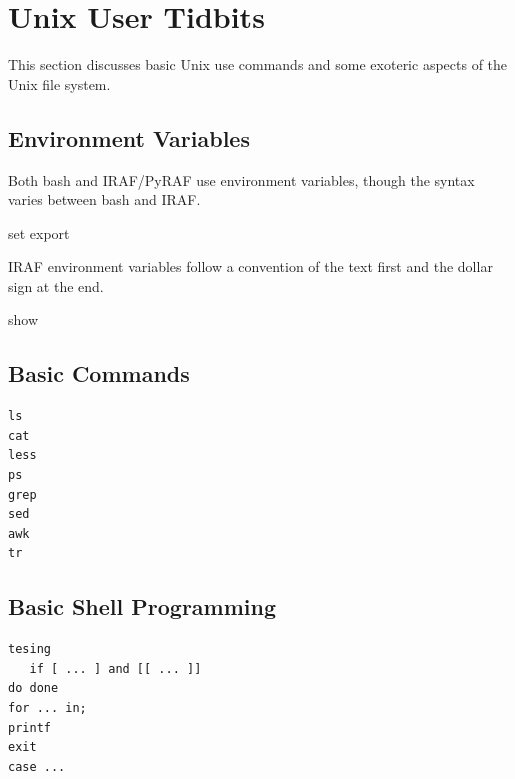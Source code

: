 \renewcommand{\footerfilename}{UnixUser.tex}

\section{Unix User Tidbits}


This section discusses basic Unix use commands and some exoteric aspects
of the Unix file system.

\subsection{Environment Variables}

Both bash and IRAF/PyRAF use environment variables, though the syntax varies
between bash and IRAF. 

set
export

IRAF environment variables follow a convention of the text first and
the dollar sign at the end.

show



\subsection{Basic Commands} 

\begingroup \fontsize{10pt}{10pt}
\selectfont
\begin{verbatim} 
ls
cat
less
ps
grep
sed
awk
tr
\end{verbatim}
\endgroup


\subsection{Basic Shell Programming} \label{sec:BasicShellProgramming}

\begingroup \fontsize{10pt}{10pt}
\selectfont
\begin{verbatim} 
tesing
   if [ ... ] and [[ ... ]]
do done
for ... in; 
printf
exit
case ...
\end{verbatim}
\endgroup


